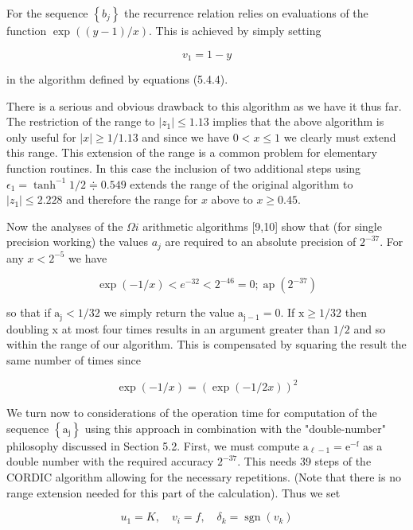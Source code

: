 \documentclass[10pt]{article}
\begin{document}
For the sequence $\left\{b_{j}\right\}$ the recurrence relation relies on evaluations of the function $\exp ((y-1) / x)$. This is achieved by simply setting

$$
v_{1}=1-y
$$

in the algorithm defined by equations (5.4.4).

There is a serious and obvious drawback to this algorithm as we have it thus far. The restriction of the range to $\left|z_{1}\right| \leqslant 1.13$ implies that the above algorithm is only useful for $|x| \geqslant 1 / 1.13$ and since we have $0<x \leqslant 1$ we clearly must extend this range. This extension of the range is a common problem for elementary function routines. In this case the inclusion of two additional steps using $\epsilon_{1}=\tanh ^{-1} 1 / 2 \doteqdot 0.549$ extends the range of the original algorithm to $\left|z_{1}\right| \leqslant 2.228$ and therefore the range for $x$ above to $x \geqslant 0.45$.

Now the analyses of the $\Omega i$ arithmetic algorithms [9,10] show that (for single precision working) the values $a_{j}$ are required to an absolute precision of $2^{-37}$. For any $x<2^{-5}$ we have


\begin{equation*}
\exp (-1 / x)<e^{-32}<2^{-46}=0 ; \operatorname{ap}\left(2^{-37}\right) \tag{5.4.5}
\end{equation*}


so that if $\mathrm{a}_{\mathrm{j}}<1 / 32$ we simply return the value $\mathrm{a}_{\mathrm{j}-1}=0$. If $\mathrm{x} \geqslant 1 / 32$ then doubling x at most four times results in an argument greater than $1 / 2$ and so within the range of our algorithm. This is compensated by squaring the result the same number of times since

$$
\exp (-1 / x)=(\exp (-1 / 2 x))^{2}
$$

We turn now to considerations of the operation time for computation of the sequence $\left\{\mathrm{a}_{\mathrm{j}}\right\}$ using this approach in combination with the "double-number" philosophy discussed in Section 5.2. First, we must compute $\mathrm{a}_{\ell-1}=\mathrm{e}^{-\mathrm{f}}$ as a double number with the required accuracy $2^{-37}$. This needs 39 steps of the CORDIC algorithm allowing for the necessary repetitions. (Note that there is no range extension needed for this part of the calculation). Thus we set

$$
u_{1}=K, \quad v_{i}=f, \quad \delta_{k}=\operatorname{sgn}\left(v_{k}\right)
$$
\end{document}
